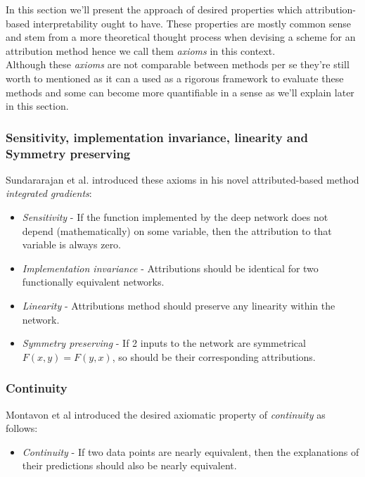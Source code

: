 \documentclass[12pt]{report}
\begin{document}
In this section we'll present the approach of desired properties which attribution-based interpretability ought to have. These properties are mostly common sense and stem from a more theoretical thought process when devising a scheme for an attribution method hence we call them \textit{axioms} in this context. \\ 

Although these \textit{axioms} are not comparable between methods per se they're still worth to mentioned as it can a used as a rigorous framework to evaluate these methods and some can become more quantifiable in a sense as we'll explain later in this section. \\

\subsubsection{Sensitivity, implementation invariance, linearity and Symmetry preserving}

Sundararajan et al. \cite{DBLP:journals/corr/SundararajanTY17} introduced these axioms in his novel attributed-based method \textit{integrated gradients}:
\begin{itemize}
	\item \textit{Sensitivity} -  If the function implemented by the deep network does not depend (mathematically) on some variable, then the attribution to that variable is always zero.
	\item \textit{Implementation invariance} - Attributions should be identical for two functionally equivalent networks.
	\item \textit{Linearity} - Attributions method should preserve any linearity within the network.
	\item \textit{Symmetry preserving} - If 2 inputs to the network are symmetrical $F(x,y)=F(y,x)$, so should be their corresponding attributions. 
\end{itemize}

\subsubsection{Continuity}
Montavon et al \cite{DBLP:journals/corr/MontavonSM17} introduced the desired axiomatic property of \textit{continuity} as follows:
\begin{itemize}
	\item \textit{Continuity} - If two data points are nearly equivalent, then the explanations of their predictions should also be	nearly equivalent.
\end{itemize}
\end{document}
